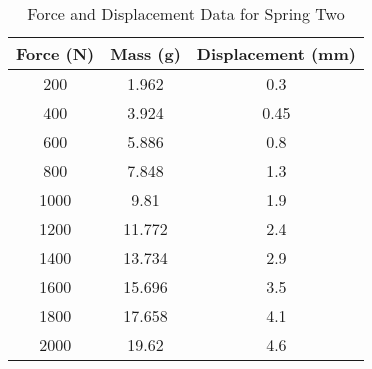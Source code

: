 \begin{table}[H]
	\centering
	\caption{Force and Displacement Data for Spring Two \label{table2}}
	\begin{tabular}{ccc}
		\hline
		\textbf{Force (N)} & \textbf{Mass (g)} & \textbf{Displacement (mm)} \\
		\hline
		200                & 1.962             & 0.3                        \\
		400                & 3.924             & 0.45                       \\
		600                & 5.886             & 0.8                        \\
		800                & 7.848             & 1.3                        \\
		1000               & 9.81              & 1.9                        \\
		1200               & 11.772            & 2.4                        \\
		1400               & 13.734            & 2.9                        \\
		1600               & 15.696            & 3.5                        \\
		1800               & 17.658            & 4.1                        \\
		2000               & 19.62             & 4.6                        \\
		\hline
	\end{tabular}
\end{table}